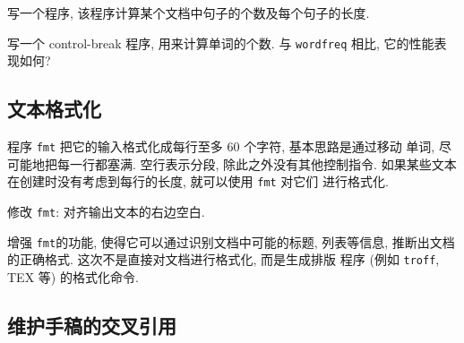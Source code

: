 \begin{exercise}
    写一个程序, 该程序计算某个文档中句子的个数及每个句子的长度.
\end{exercise}

\begin{exercise}
    写一个 control-break 程序, 用来计算单词的个数. 与 \texttt{wordfreq}
    相比, 它的性能表现如何?
\end{exercise}

\subsection{文本格式化}
\label{subsec:text_formatting}

程序 \texttt{fmt} 把它的输入格式化成每行至多 60 个字符, 基本思路是通过移动
单词, 尽可能地把每一行都塞满. 空行表示分段, 除此之外没有其他控制指令.
如果某些文本在创建时没有考虑到每行的长度, 就可以使用 \texttt{fmt} 对它们
进行格式化.

\begin{exercise}
    \label{exer:fmt_justify}
    修改 \texttt{fmt}: 对齐输出文本的右边空白.
\end{exercise}

\begin{exercise}
    增强 \texttt{fmt}的功能, 使得它可以通过识别文档中可能的标题, 列表等信息,
    推断出文档的正确格式. 这次不是直接对文档进行格式化, 而是生成排版
    程序 (例如 \texttt{troff}, TEX 等) 的格式化命令.
\end{exercise}

\subsection{维护手稿的交叉引用}
\label{subsec:maintaining_cross_reference_in_manuscripts}

